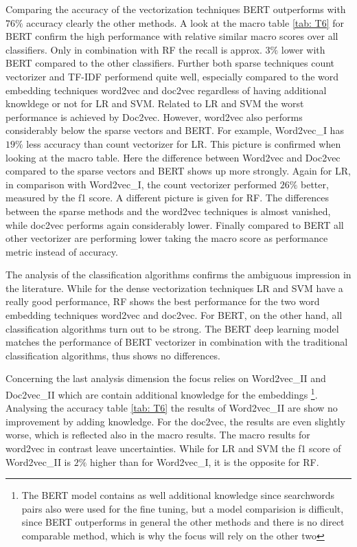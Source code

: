\documentclass[12pt, a4paper, titlepage]{article}
\begin{document}
Comparing the accuracy of the vectorization techniques \ac{BERT} outperforms with $76\%$ accuracy clearly the other methods. A look at the macro table \ref{tab: T6} for BERT confirm the high performance with relative similar macro scores over all classifiers. Only in combination with \ac{RF} the recall is approx. $3\%$ lower with \ac{BERT} compared to the other classifiers. Further both sparse techniques count vectorizer and \ac{TF-IDF} performend quite well, especially compared to the word embedding techniques word2vec and doc2vec regardless of having additional knowldege or not for \ac{LR} and \ac{SVM}. Related to \ac{LR} and \ac{SVM} the worst performance is achieved by Doc2vec. However, word2vec also performs considerably below the sparse vectors and \ac{BERT}. For example, Word2vec\_I has $19\%$ less accuracy than count vectorizer for \ac{LR}. This picture is confirmed when looking at the macro table. Here the difference between Word2vec and Doc2vec compared to the sparse vectors and BERT shows up more strongly. Again for \ac{LR}, in comparison with Word2vec\_I, the count vectorizer performed $26\% $ better, measured by the f1 score. A different picture is given for \ac{RF}. The differences between the sparse methods and the word2vec techniques is almost vanished, while doc2vec performs again considerably lower. Finally compared to \ac{BERT} all other vectorizer are performing lower taking the macro score as performance metric instead of accuracy. 

The analysis of the classification algorithms confirms the ambiguous impression in the literature. While for the dense vectorization techniques LR and SVM have a really good performance, RF shows the best performance for the two word embedding techniques word2vec and doc2vec. For BERT, on the other hand, all classification algorithms turn out to be strong. The BERT deep learning model matches the performance of BERT vectorizer in combination with the traditional classification algorithms, thus shows no differences. 

Concerning the last analysis dimension the focus relies on Word2vec\_II and Doc2vec\_II which are contain additional knowledge for the embeddings \footnote{The \ac{BERT} model contains as well additional knowledge since searchwords pairs also were used for the fine tuning, but a model comparision is difficult, since \ac{BERT} outperforms in general the other methods and there is no direct comparable method, which is why the focus will rely on the other two}. Analysing the accuracy table \ref{tab: T6} the results of Word2vec\_II are show no improvement by adding knowledge. For the doc2vec, the results are even slightly worse, which is reflected also in the macro results. The macro results for word2vec in contrast leave uncertainties. While for \ac{LR} and \ac{SVM} the f1 score of Word2vec\_II is $2\%$ higher than for Word2vec\_I, it is the opposite for \ac{RF}. 
\end{document}
